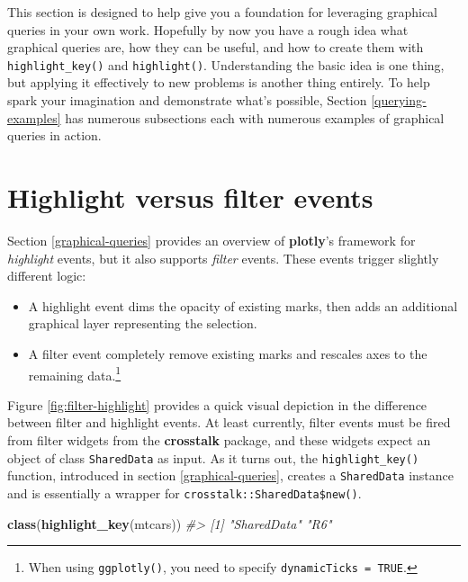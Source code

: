 \documentclass[
  12pt,
]{krantz}
\newenvironment{Shaded}{\begin{snugshade}}{\end{snugshade}}
\newcommand{\CommentTok}[1]{\textcolor[rgb]{0.56,0.35,0.01}{\textit{#1}}}
\newcommand{\KeywordTok}[1]{\textcolor[rgb]{0.13,0.29,0.53}{\textbf{#1}}}
\newcommand{\NormalTok}[1]{#1}
\providecommand{\tightlist}{%
  \setlength{\itemsep}{0pt}\setlength{\parskip}{0pt}}
\begin{document}
This section is designed to help give you a foundation for leveraging graphical queries in your own work. Hopefully by now you have a rough idea what graphical queries are, how they can be useful, and how to create them with \texttt{highlight\_key()} and \texttt{highlight()}. Understanding the basic idea is one thing, but applying it effectively to new problems is another thing entirely. To help spark your imagination and demonstrate what's possible, Section \ref{querying-examples} has numerous subsections each with numerous examples of graphical queries in action.

\hypertarget{filter}{%
\section{Highlight versus filter events}\label{filter}}

Section \ref{graphical-queries} provides an overview of \textbf{plotly}'s framework for \emph{highlight} events, but it also supports \emph{filter} events. These events trigger slightly different logic:

\begin{itemize}
\tightlist
\item
  A highlight event dims the opacity of existing marks, then adds an additional graphical layer representing the selection.
\item
  A filter event completely remove existing marks and rescales axes to the remaining data.\footnote{When using \texttt{ggplotly()}, you need to specify \texttt{dynamicTicks\ =\ TRUE}.}
\end{itemize}

Figure \ref{fig:filter-highlight} provides a quick visual depiction in the difference between filter and highlight events. At least currently, filter events must be fired from filter widgets from the \textbf{crosstalk} package, and these widgets expect an object of class \texttt{SharedData} as input. As it turns out, the \texttt{highlight\_key()} function, introduced in section \ref{graphical-queries}, creates a \texttt{SharedData} instance and is essentially a wrapper for \texttt{crosstalk::SharedData\$new()}.

\begin{Shaded}
\begin{Highlighting}[]
\KeywordTok{class}\NormalTok{(}\KeywordTok{highlight_key}\NormalTok{(mtcars))}
\CommentTok{#> [1] "SharedData" "R6"}
\end{Highlighting}
\end{Shaded}
\end{document}
